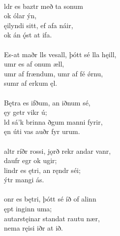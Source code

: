  \\

\bva {}ldr es baztr \hld með ta sonum \\%
\ind ok ólar ýn, \\%
ęilyndi sitt, \hld ef afa náir, \\%
\ind ok án ǫ́st at ifa.\\%

 \\

\bva Es-at maðr lls vesall, \hld þótt sé lla hęill, \\%
\ind {}umr es af onum æll, \\%
umr af frændum, \hld {}umr af fé ǿrnu, \\%
\ind sumr af erkum ęl.\\%

 \\

\bva Bętra es ifðum, \hld an iðnum sé, \\%
\ind ęy getr vikr ú; \\%
ld sá'k brinna \hld {}ðgum manni fyrir, \\%
\ind ęn úti vas auðr fyr urum.\\%

 \\

\bva {}altr ríðr rossi, \hld {}jǫrð rekr andar vanr, \\%
\ind daufr egr ok ugir; \\%
lindr es ętri, \hld an ręndr séi; \\%
\ind {}ýtr mangi ás.\\%

 \\

\bva {}onr es bętri, \hld þótt sé íð of alinn \\%
\ind ępt inginn uma; \\%
autarstęinar \hld standat rautu nær, \\%
\ind nema ręisi iðr at ið.\\%

 \\


